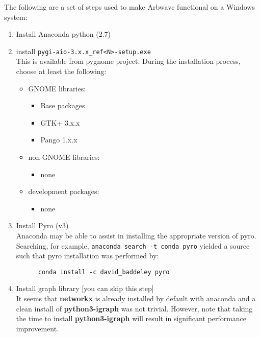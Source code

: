The following are a set of steps used to make Arbwave functional on a Windows system:
\begin{enumerate}
  \item Install Anaconda python (2.7)
  \item install \verb|pygi-aio-3.x.x_ref<N>-setup.exe| \\
    This is available from pygnome project.
    During the installation process, choose at least the following:
    \begin{itemize}
      \item GNOME libraries:
        \begin{itemize}
          \item Base packages
          \item GTK+ 3.x.x
          \item Pango 1.x.x
        \end{itemize}
      \item non-GNOME libraries:
        \begin{itemize}
          \item none
        \end{itemize}
      \item development packages:
        \begin{itemize}
          \item none
        \end{itemize}
    \end{itemize}

  \item Install Pyro (v3) \\
    Anaconda may be able to assist in installing the appropriate version of pyro.
      Searching, for example, \verb|anaconda search -t conda pyro| yielded a source such
    that pyro installation was performed by:
    \begin{verbatim}
      conda install -c david_baddeley pyro
    \end{verbatim}

  \item Install graph library [you can skip this step] \\
    It seems that \textbf{networkx} is already installed by default with
    anaconda and a clean install of \textbf{python3-igraph}
    was not trivial.  However, note that taking the time to install 
    \textbf{python3-igraph} will result in significant performance improvement.


\end{enumerate}
